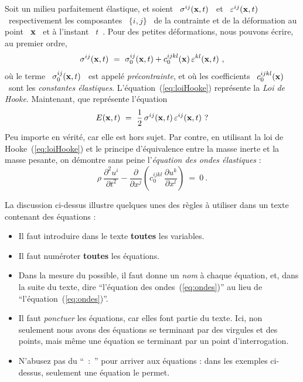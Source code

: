 \documentclass{ipgpmaster}
\begin{document}
Soit un milieu parfaitement élastique, et soient
\ $ \sigma^{ij} ({\bf x},t) $ \ 
et
\ $ \varepsilon^{ij} ({\bf x},t) $ \ 
respectivement les composantes 
\ $ \{i,j\} $ \ 
de la contrainte et de la déformation au point 
\ $ {\bf x} $ \ 
et à l'instant 
\ $ t $~.
Pour des petites déformations, nous pouvons écrire, au premier ordre,
\begin{equation}
     \sigma^{ij} ({\bf x},t) 
     \ = \  
     \sigma_0^{ij} ({\bf x},t) 
     + 
     c_0^{ijkl} ({\bf x}) 
     \,  
     \varepsilon^{kl} ({\bf x},t) 
     \ , 
          \label{eq:loiHooke}
\end{equation}
où le terme 
\ $ \sigma_0^{ij} ({\bf x},t) $ \ 
est appelé \emph{précontrainte\/}, et où les coefficients 
\ $ c_0^{ijkl} ({\bf x}) $ \ 
sont les \emph{constantes élastiques\/}. 
L'équation~(\ref{eq:loiHooke}) représente la \emph{ Loi de Hooke\/}.
Maintenant, que représente l'équation
\begin{equation}
     E({\bf x},t) 
     \ = \  
     \frac{1}{2} 
     \, 
     \sigma^{ij} ({\bf x},t) 
     \, 
     \varepsilon^{ij} ({\bf x},t)
     \ ? 
          \label{eq:energydensity}
\end{equation}
Peu importe en vérité, car elle est hors sujet. 
Par contre, en utilisant la loi de Hooke~(\ref{eq:loiHooke}) et le principe
 d'équivalence entre la masse inerte et la masse pesante, 
on démontre sans peine l'\emph{équation des ondes élastiques\/} :
\begin{equation}
     \rho \ 
     \frac{\partial^2 u^i}{\partial t^2} 
     - 
     \frac{\partial}{\partial x^j} 
     \left( 
           c_0^{ijkl} 
           \, 
           \frac{\partial u^k}{\partial x^l} 
     \right)
     \ = \  
     0 
     \ . 
          \label{eq:ondes}
\end{equation}

La discussion ci-dessus illustre quelques unes des règles à utiliser dans 
un texte contenant des équations :

\begin{itemize}
     \item  Il faut introduire dans le texte {\bfseries toutes} les variables.

     \item  Il faut numéroter {\bfseries toutes} les équations.

     \item  Dans la mesure du possible, il faut donne un \emph{nom\/} à 
            chaque équation, et, dans la suite du texte, dire 
            ``l'équation des ondes~(\ref{eq:ondes})'' 
            au lieu de ``l'équation~(\ref{eq:ondes})''.

     \item  Il faut \emph{ponctuer\/} les équations, car elles font 
            partie du texte. Ici, non seulement nous avons des équations 
            se terminant par des virgules et des points, mais même 
            une équation se terminant par un point d'interrogation.

     \item  N'abusez pas du ``~:~'' pour arriver aux équations : 
            dans les exemples ci-dessus, seulement une équation le permet.
\end{itemize}
\end{document}
